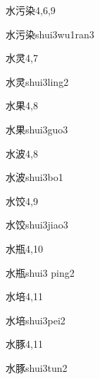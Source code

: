 \begin{entry}{水污染}{4,6,9}
  \begin{phonetics}{水污染}{shui3wu1ran3}
  \end{phonetics}
\end{entry}

\begin{entry}{水灵}{4,7}
  \begin{phonetics}{水灵}{shui3ling2}
  \end{phonetics}
\end{entry}

\begin{entry}{水果}{4,8}
  \begin{phonetics}{水果}{shui3guo3}
  \end{phonetics}
\end{entry}

\begin{entry}{水波}{4,8}
  \begin{phonetics}{水波}{shui3bo1}
  \end{phonetics}
\end{entry}

\begin{entry}{水饺}{4,9}
  \begin{phonetics}{水饺}{shui3jiao3}
  \end{phonetics}
\end{entry}

\begin{entry}{水瓶}{4,10}
  \begin{phonetics}{水瓶}{shui3 ping2}
  \end{phonetics}
\end{entry}

\begin{entry}{水培}{4,11}
  \begin{phonetics}{水培}{shui3pei2}
  \end{phonetics}
\end{entry}

\begin{entry}{水豚}{4,11}
  \begin{phonetics}{水豚}{shui3tun2}
  \end{phonetics}
\end{entry}

